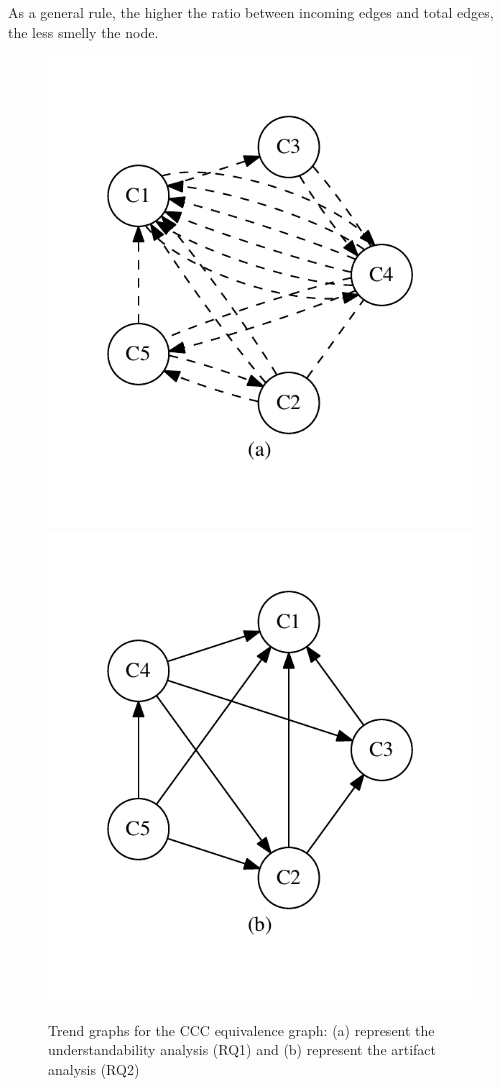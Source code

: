 As a general rule, the higher the ratio between incoming edges and total edges, the less smelly the node. 

\begin{figure}[tb]
\centering
\includegraphics[width=0.48\columnwidth]{graphs/ccom.pdf}
\includegraphics[width=0.48\columnwidth]{graphs/cart.pdf}
\vspace{-12pt}
\caption{Trend graphs for the CCC equivalence graph: (a) represent the understandability analysis (RQ1) and (b) represent the artifact analysis (RQ2)}

\label{fig:graphsforanalysis}
\end{figure}



